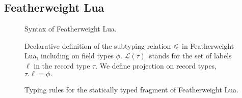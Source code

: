 \subsection{Featherweight Lua}
\label{subsec:featherweight-lua}

\newcommand{\graintro}[1]{{#1} \,::=&\; }
\newcommand{\graitem}{\\ \mid&\;}

\newcommand{\defeq}{\stackrel{\Delta}{=}}

\newcommand{\fllet}[2]{\mathrm{let}\,{#1}={#2}\,\mathrm{in}\,}
\newcommand{\flletx}[2]{\mathrm{let}\,{#1}={#2}}
\newcommand{\fllam}[1]{\lambda {#1} \ldotp}
\newcommand{\flrec}[1]{\left\{ {#1} \right\}}
\newcommand{\flext}[2]{\left\{ {#1} \,\middle|\, {#2} \right\}}
\newcommand{\flproj}[2]{{#1}{.}{#2}}
\newcommand{\flcast}[2]{{#1} \vartriangleright {#2}}

\newcommand{\flabsent}{\_}

\begin{figure}
    \centering
    
    \caption{Syntax of Featherweight Lua.}
    \label{fig:featherweight-lua-grammar}
\end{figure}

\newcommand{\irule}[3]{{\renewcommand\arraystretch{1.5} \begin{array}{ll} \textsc{#1} \\ \dfrac{\phantom| #2 \phantom|}{\phantom| #3 \phantom|}\end{array}}}

\newcommand{\erased}[1]{\textcolor{red}{#1}}

\begin{figure}
    \centering
    
    \caption{Declarative definition of the subtyping relation $\leqslant$ in Featherweight Lua, including on field types $\phi$. $\mathcal L(\tau)$~stands for the set of labels $\ell$ in the record type $\tau$. We define projection on record types,~$\flproj{\tau}{\ell} = \phi.$}
    \label{fig:featherweight-lua-subtyping}
\end{figure}

\begin{figure}
    
    \caption{Typing rules for the statically typed fragment of Featherweight Lua.}
    \label{fig:featherweight-lua-typing}
\end{figure}

\newcommand{\denot}[1]{\left\llbracket#1\right\rrbracket}
\newcommand{\denotl}[1]{\left\lceil\!\!\left\lceil#1\right\rceil\!\!\right\rceil}
\newcommand{\denoty}[1]{\left(\!\left| #1
\right|\!\right)}
\newcommand{\centredalign}{\hspace{.45\textwidth}\phantom{{}={}}&\phantom{{}={}}\hspace{.45\textwidth}}

